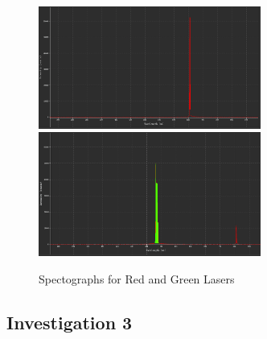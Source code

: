 \documentclass{article}[12pt]
\begin{document}
\begin{figure} [H]
  \centering
  \includegraphics[width=0.65\textwidth]{figures/red_laser.png}
  \includegraphics[width=0.65\textwidth]{figures/green_laser.png}
  \caption{Spectographs for Red and Green Lasers}
  \label{lasers}
\end{figure}

\subsection{Investigation 3}
\end{document}
